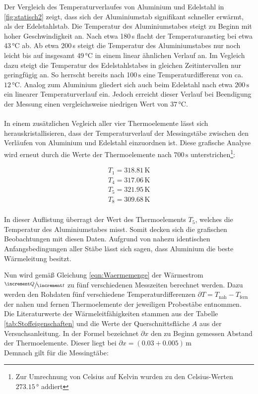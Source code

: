 Der Vergleich des Temperaturverlaufes von Aluminium und Edelstahl in \ref{fig:statisch2} zeigt, dass 
sich der Aluminiumstab signifikant schneller erwärmt, als der Edelstahlstab.
Die Temperatur des Aluminiumstabes steigt zu Beginn mit hoher Geschwindigkeit an. Nach etwa 180\,\unit{\second} 
flacht der Temperaturanstieg bei etwa 43\,\unit{\celsius} ab. Ab etwa 200\,\unit{\second} steigt die Temperatur des Aluminiumstabes 
nur noch leicht bis auf insgesamt 49\,\unit{\celsius} in einem linear ähnlichen Verlauf an. Im Vegleich dazu steigt die Temperatur 
des Edelstahlstabes in gleichen Zeitintervallen nur geringfügig an. So herrscht bereits nach 100\,$\unit{\second}$ eine
Temperaturdifferenz von ca. $12\,\unit{\celsius}$. Analog zum Aluminium gliedert sich auch beim Edelstahl nach etwa $200\,\unit{\second}$
ein linearer Temperaturverlauf ein. Jedoch erreicht dieser Verlauf bei Beendigung der Messung einen vergleichsweise niedrigen
Wert von $37\,\unit{\celsius}$. \\\\
In einem zusätzlichen Vegleich aller vier Thermoelemente lässt sich herauskristallisieren, dass der Temperaturverlauf der Messingstäbe
zwischen den Verläufen von Aluminium und Edelstahl einzuordnen ist. Diese grafische Analyse wird erneut durch die Werte der Thermoelemente
nach $700\,\unit{\second}$ unterstrichen\footnote{Zur Umrechnung von Celsius auf Kelvin wurden zu den Celsius-Werten $273.15\,\unit{\degree}$ addiert}:

\begin{gather*}
  T_1 = 318.81\,\unit{\kelvin}\\ 
  T_4 = 317.06\,\unit{\kelvin}\\
  T_5 = 321.95\,\unit{\kelvin}\\
  T_8 = 309.68\,\unit{\kelvin}\\
\end{gather*}

In dieser Auflistung überragt der Wert des Thermoelements $T_5$, welches die Temperatur des Aluminiumstabes misst. Somit decken sich die grafischen
Beobachtungen mit diesen Daten. Aufgrund von nahezu identischen Anfangsbedingungen aller Stäbe lässt sich sagen, dass Aluminium die beste 
Wärmeleitung besitzt.

Nun wird gemäß Gleichung \eqref{eqn:Waermemenge} der Wärmestrom $\sfrac{\increment Q}{\increment t}$ zu fünf verschiedenen Messzeiten berechnet
werden. Dazu werden den Rohdaten fünf verschiedene Temperaturdifferenzen $\partial T = T_\text{nah} - T_\text{fern}$ der nahen und fernen Thermoelemente der jeweiligen Probestäbe entnommen.
Die Literaturwerte der Wärmeleitfähigkeiten stammen aus der Tabelle \ref{tab:Stoffeigenschaften} und die Werte der Querschnittsfläche $A$ aus der
Versuchsanleitung\cite{Versuchsanleitung_v204}. In der Formel bezeichnet $\partial x$ den zu Beginn gemessen Abstand der Thermoelemente. 
Dieser liegt bei $\partial x = \left(0.03 + 0.005\right)\,\unit{\meter}$ \\
Demnach gilt für die Messingtäbe:

